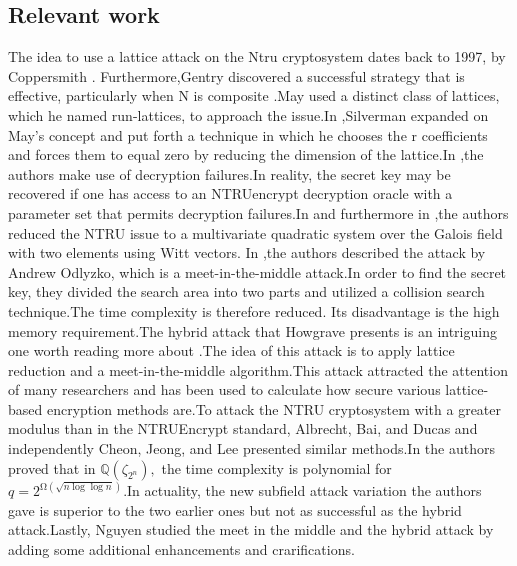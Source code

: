 \documentclass{amsart}
\numberwithin{equation}{section}
\begin{document}
\subsection{Relevant work}
The idea to use a lattice attack on the Ntru cryptosystem dates back to 1997, by Coppersmith \cite{CopSha97}.
Furthermore,Gentry discovered a successful strategy that is effective, particularly when N is composite \cite{gentry}.May \cite{May} used a distinct class of lattices, which he named run-lattices, to approach the issue.In \cite{Silverman},Silverman expanded on May's concept and put forth a technique in which he chooses the r coefficients and forces them to equal zero by reducing the dimension of the lattice.In \cite{Gama-Nguyen},the authors make use of decryption failures.In reality, the secret key may be recovered if one has access to an NTRUencrypt decryption oracle with a parameter set that permits decryption failures.In \cite{witt} and furthermore in \cite{gerald},the authors reduced the NTRU issue to a multivariate quadratic system over the Galois field with two elements using Witt vectors.
In \cite{Odlyzko},the authors described the attack by Andrew Odlyzko, which is a meet-in-the-middle attack.In order to find the secret key, they divided the search area into two parts and utilized a collision search technique.The time complexity is therefore reduced. Its disadvantage is the high memory requirement.The hybrid attack that Howgrave presents is an intriguing one worth reading more about \cite{hybrid attack}.The idea of this attack is to apply lattice reduction and a meet-in-the-middle algorithm.This attack attracted the attention of many researchers and has been used to calculate how secure various lattice-based encryption methods are.To attack the NTRU cryptosystem with a greater modulus than in the NTRUEncrypt standard, Albrecht, Bai, and Ducas \cite{Albrecht} and independently Cheon, Jeong, and Lee \cite{Cheon} presented similar methods.In \cite{Kirchner} the authors proved that in $\mathbb {Q}(\zeta _{2^n}),$ the time complexity is polynomial for  $q=2^{\mathrm {\Omega }(\sqrt{n\log \log n})}.$In actuality, the new subfield attack variation the authors gave is superior to the two earlier ones but not as successful as the hybrid attack.Lastly, Nguyen \cite{Nguyen - Boosting the hybrid} studied the meet in the middle and the hybrid attack by adding some additional enhancements and crarifications.
\end{document}
